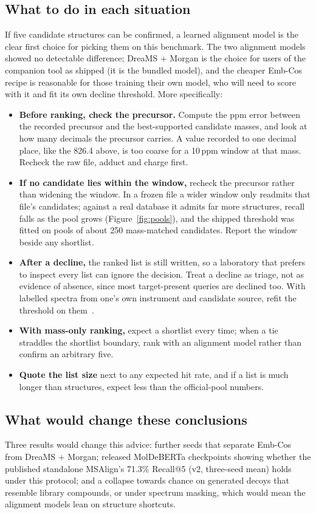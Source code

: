 \documentclass[11pt]{article}
\begin{document}
\subsection{What to do in each situation}\label{sec:guidance}
If five candidate structures can be confirmed, a learned alignment model is the clear first choice for picking them on this
benchmark. The two alignment models showed no detectable difference; DreaMS + Morgan is the choice for users of the companion
tool as shipped (it is the bundled model), and the cheaper Emb-Cos recipe is reasonable for those training their own model,
who will need to score with it and fit its own decline threshold. More specifically:
\begin{itemize}
\item \textbf{Before ranking, check the precursor.} Compute the ppm error between the recorded precursor and the
best-supported candidate masses, and look at how many decimals the precursor carries. A value recorded to one decimal place,
like the 826.4 above, is too coarse for a 10\,ppm window at that mass. Recheck the raw file, adduct and charge first.
\item \textbf{If no candidate lies within the window,} recheck the precursor rather than widening the window. In a frozen file
a wider window only readmits that file's candidates; against a real database it admits far more structures, recall falls as
the pool grows (Figure~\ref{fig:pools}), and the shipped threshold was fitted on pools of about 250 mass-matched candidates.
Report the window beside any shortlist.
\item \textbf{After a decline,} the ranked list is still written, so a laboratory that prefers to inspect every list can ignore
the decision. Treat a decline as triage, not as evidence of absence, since most target-present queries are declined too. With
labelled spectra from one's own instrument and candidate source, refit the threshold on them~\citep{rakhshaninejad2026}.
\item \textbf{With mass-only ranking,} expect a shortlist every time; when a tie straddles the shortlist boundary, rank with an
alignment model rather than confirm an arbitrary five.
\item \textbf{Quote the list size} next to any expected hit rate, and if a list is much longer than \DedupMedian{} structures,
expect less than the official-pool numbers.
\end{itemize}

\subsection{What would change these conclusions}\label{sec:change}
Three results would change this advice: further seeds that separate Emb-Cos from DreaMS + Morgan; released MolDeBERTa
checkpoints showing whether the published standalone MSAlign's 71.3\% Recall@5 (v2, three-seed mean) holds under this
protocol; and a collapse towards chance on generated decoys that resemble library compounds, or under spectrum masking, which
would mean the alignment models lean on structure shortcuts.
\end{document}
